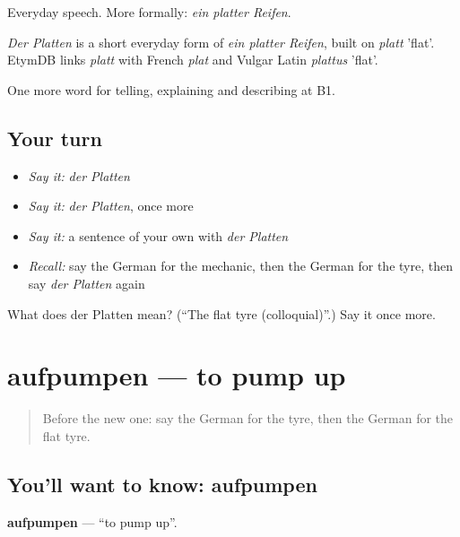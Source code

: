 Everyday speech. More formally: \emph{ein platter Reifen}.

\begin{cousinweb}
\emph{Der Platten} is a short everyday form of \emph{ein platter Reifen}, built on \emph{platt} 'flat'. EtymDB links \emph{platt} with French \emph{plat} and Vulgar Latin \emph{plattus} 'flat'.
\end{cousinweb}

\begin{grammarlens}[title={What you've built}]
One more word for telling, explaining and describing at B1.
\end{grammarlens}

\subsection*{Your turn}
\begin{itemize}
\raggedright
  \item \emph{Say it:} \emph{der Platten}
  \item \emph{Say it:} \emph{der Platten}, once more
  \item \emph{Say it:} a sentence of your own with \emph{der Platten}
  \item \emph{Recall:} say the German for the mechanic, then the German for the tyre, then say \emph{der Platten} again
\end{itemize}

\begin{tcolorbox}[breakable,colback=teal!4,colframe=teal!35!black,title={Before you move on}]
What does der Platten mean? (\textquotedblleft{}The flat tyre (colloquial)\textquotedblright{}.) Say it once more.
\end{tcolorbox}
\section[aufpumpen]{aufpumpen — to pump up}

\label{lesson:GE-C404-aufpumpen}



\begin{quote}
Before the new one: say the German for the tyre, then the German for the flat tyre.
\end{quote}

\subsection*{You'll want to know: aufpumpen}
\textbf{aufpumpen} — \textquotedblleft{}to pump up\textquotedblright{}.

